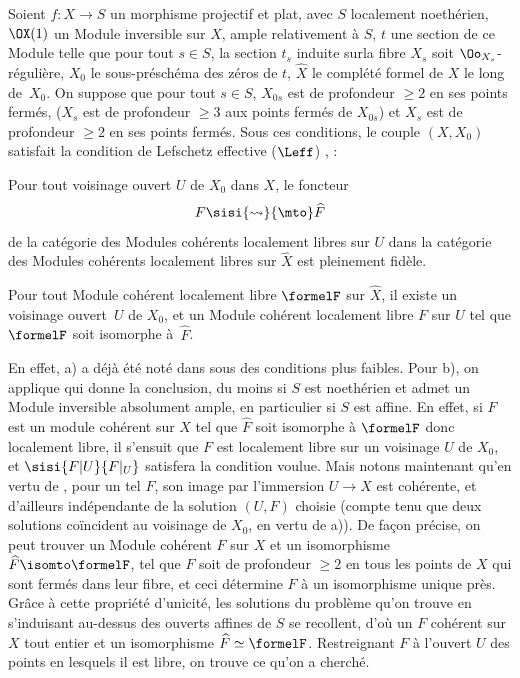 \begin{corollaire} \label{XII.3.4}
Soient $f:X\to S$ un morphisme projectif et plat, avec $S$ localement noeth\'erien, $\OX(1)$ un Module inversible sur $X$, ample relativement \`a $S$, $t$ une section de ce Module telle que pour tout $s\in S$, la section $t_s$ induite sur\pageoriginale la fibre $X_s$ soit $\Oo_{X_s}$-r\'eguli\`ere, $X_0$ le sous-pr\'esch\'ema des z\'eros de $t$, $\widehat{X}$ le compl\'et\'e formel de $X$ le long de~$X_0$. On suppose que pour tout $s\in S$, $X_{0s}$ est de profondeur $\geq 2$ en ses points ferm\'es, (\ie $X_s$ est de profondeur $\geq 3$ aux points ferm\'es de $X_{0s}$) et $X_s$ est de profondeur $\geq 2$ en ses points ferm\'es. Sous ces conditions, le couple $(X, X_0)$ satisfait la condition de Lefschetz effective ($\Leff$) , \ie:
\begin{enumeratea}
\item
Pour tout voisinage ouvert $U$ de $X_0$ dans $X$, le foncteur
\[
F \sisi{\rightsquigarrow}{\mto} \widehat{F}
\]
de la cat\'egorie des Modules coh\'erents localement libres sur $U$ dans la cat\'egorie des Modules coh\'erents localement libres sur $\widehat{X}$ est pleinement fid\`ele.
\item
Pour tout Module coh\'erent localement libre $\formelF$ sur $\widehat{X}$, il existe un voisinage ouvert~$U$ de $X_0$, et un Module coh\'erent localement libre $F$ sur $U$ tel que $\formelF$ soit isomorphe \`a~$\widehat{F}$.
\end{enumeratea}
\end{corollaire}

En effet, a) a d\'ej\`a \'et\'e not\'e dans  sous des conditions plus faibles. Pour b), on applique  qui donne la conclusion, du moins si $S$ est noeth\'erien et admet un Module inversible absolument ample, en particulier si $S$ est affine. En effet, si $F$ est un module coh\'erent sur $X$ tel que $\widehat{F}$ soit isomorphe \`a $\formelF$ donc localement libre, il s'ensuit que $F$ est localement libre sur un voisinage $U$ de $X_0$, et $\sisi{F|U}{F|_U}$ satisfera la condition voulue. Mais notons maintenant qu'en vertu de , pour un tel $F$, son image par l'immersion $U\to X$ est coh\'erente, et d'ailleurs ind\'ependante de la solution $(U, F)$ choisie (compte tenu  que deux solutions co\"incident au voisinage de $X_0$, en vertu de a)). De fa\c con pr\'ecise, on peut trouver un Module coh\'erent $F$ sur $X$ et un isomorphisme $\widehat{F}\isomto \formelF$, tel que $F$ soit de profondeur $\geq 2$ en tous les points de $X$ qui sont ferm\'es dans leur fibre, et ceci d\'etermine $F$ \`a un isomorphisme unique pr\`es. Gr\^ace \`a cette propri\'et\'e d'unicit\'e, les solutions du probl\`eme qu'on trouve en s'induisant au-dessus des ouverts affines de $S$ se recollent, d'o\`u un $F$ coh\'erent sur $X$ tout entier et un isomorphisme $\widehat{F}\simeq \formelF$. Restreignant $F$ \`a l'ouvert $U$ des points en lesquels il est libre, on trouve ce qu'on a cherch\'e.

